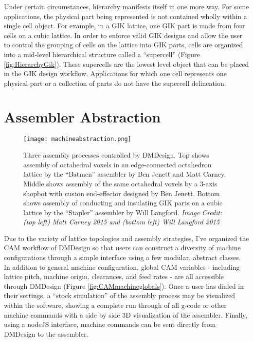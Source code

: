{Under certain circumstances, hierarchy manifests itself in one more way.  For some applications, the physical part being represented is not contained wholly within a single cell object.  For example, in a GIK lattice, one GIK part is made from four cells on a cubic lattice.  In order to enforce valid GIK designs and allow the user to control the grouping of cells on the lattice into GIK parts, cells are organized into a mid-level hierarchical structure called a ``supercell'' (Figure \ref{fig:HierarchyGik}).  These supercells are the lowest level object that can be placed in the GIK design workflow.  Applications for which one cell represents one physical part or a collection of parts do not have the supercell delineation.

\section{Assembler Abstraction}\label{sec:CAM}

\begin{figure}
  \texttt{[image: machineabstraction.png]}
  \caption{Three assembly processes controlled by DMDesign.  Top shows assembly of octahedral voxels in an edge-connected octahedron lattice by the ``Batmen'' assembler by Ben Jenett and Matt Carney.  Middle shows assembly of the same octahedral voxels by a 3-axis shopbot with custon end-effector designed by Ben Jenett.  Bottom shows assembly of conducting and insulating GIK parts on a cubic lattice by the ``Stapler'' assembler by Will Langford.  \textit{Image Credit: (top left) Matt Carney 2015 and (bottom left) Will Langford 2015}}
  \label{fig:machineabstraction}
\end{figure}

Due to the variety of lattice topologies and assembly strategies, I've organized the CAM workflow of DMDesign so that users can construct a diversity of machine configurations through a simple interface using a few modular, abstract classes.  In addition to general machine configuration, global CAM variables - including lattice pitch, machine origin, clearances, and feed rates - are all accessible through DMDesign (Figure \ref{fig:CAMmachineglobals}).  Once a user has dialed in their settings, a ``stock simulation'' of the assembly process may be visualized within the software, showing a complete run through of all g-code or other machine commands with a side by side 3D visualization of the assembler.  Finally, using a nodeJS interface, machine commands can be sent directly from DMDesign to the assembler.\\

}
